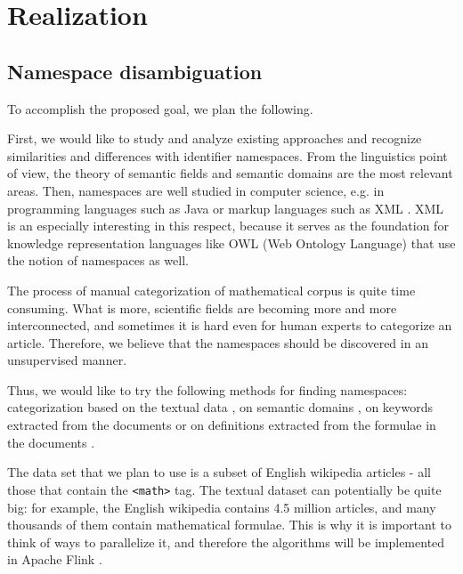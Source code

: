 

\section{Realization}
\subsection{Namespace disambiguation}

To accomplish the proposed goal, we plan the following.

First, we would like to study and analyze existing approaches and recognize similarities and differences with identifier namespaces. From the linguistics point of view, the theory of semantic fields \cite{vassilyev1974theory} and semantic domains \cite{gliozzo2009semantic} are the most relevant areas. Then, namespaces are well studied in computer science, e.g. in programming languages such as Java \cite{gosling2014java} or markup languages such as XML \cite{bray1999namespaces}. XML is an especially interesting in this respect, because it serves as the foundation for knowledge representation languages like OWL (Web Ontology Language) \cite{mcguinness2004owl} that use the notion of namespaces as well.

The process of manual categorization of mathematical corpus is quite time consuming. What is more, scientific fields are becoming more and more interconnected, and sometimes it is hard even for human experts to categorize an article. Therefore, we believe that the namespaces should be discovered in an unsupervised manner.

Thus, we would like to try the following methods for finding namespaces: categorization based on the textual data \cite{sebastiani2002machine}, on semantic domains \cite{gliozzo2009semantic}, on keywords extracted from the documents \cite{schoneberg2014pos} or on definitions extracted from the formulae in the documents \cite{pagael2014mlp}.

The data set that we plan to use is a subset of English wikipedia articles - all those that contain the \texttt{<math>} tag. The textual dataset can potentially be quite big: for example, the English wikipedia contains 4.5 million articles, and many thousands of them contain mathematical formulae. This is why it is important to think of ways to parallelize it, and therefore the algorithms will be implemented in Apache Flink \cite{source:flink}.




